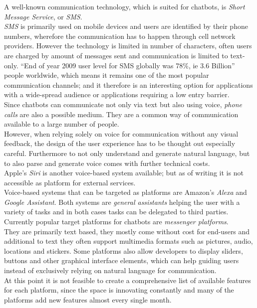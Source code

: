 A well-known communication technology, which is suited for chatbots, is \emph{Short Message Service}, or \emph{SMS}.
\\
\emph{SMS} is primarily used on mobile devices and users are identified by their phone numbers,
wherefore the communication has to happen through cell network providers.
However the technology is limited in number of characters, often users are charged by amount of messages sent and communication is limited to text-only.
``End of year 2009 user level for SMS globally was 78\%, ie 3.6 Billion''~\cite{mobilenumbers} people worldwide,
which means it remains one of the most popular communication channels;
and it therefore is an interesting option for applications with a wide-spread audience or applications requiring a low entry barrier.
\\

Since chatbots can communicate not only via text but also using voice, \emph{phone calls} are also a possible medium.
They are a common way of communication available to a large number of people.
\\
However, when relying solely on voice for communication without any visual feedback, the design of the user experience has to be thought out especially careful.
Furthermore to not only understand and generate natural language,
but to also parse and generate voice comes with further technical costs.
\\

Apple's \emph{Siri} is another voice-based system available; but as of writing it is not accessible as platform for external services.
\\
Voice-based systems that can be targeted as platforms are Amazon's \emph{Alexa} and \emph{Google Assistant}.
Both systems are \emph{general assistants} helping the user with a variety of tasks
and in both cases tasks can be delegated to third parties.
\\

Currently popular target platforms for chatbots are \emph{messenger platforms}.
\\
They are primarily text based, they mostly come without cost for end-users and additional to text they often support multimedia formats such as pictures, audio, locations and stickers.
Some platforms also allow developers to display sliders, buttons and other graphical interface elements, which can help guiding users instead of exclusively relying on natural language for communication.
\\
At this point it is not feasible to create a comprehensive list of available features for each platform, since the space is innovating constantly and many of the platforms add new features almost every single month.
\\

